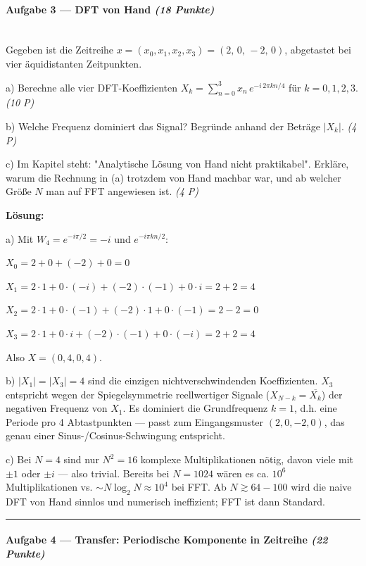 \documentclass[11pt, a4paper]{article}
\begin{document}
\paragraph{Aufgabe 3 — DFT von Hand \textit{(18 Punkte)}}\mbox{}\\[2pt]

Gegeben ist die Zeitreihe $x = (x_0, x_1, x_2, x_3) = (2,\,0,\,-2,\,0)$, abgetastet bei vier äquidistanten Zeitpunkten.


a) Berechne alle vier DFT-Koeffizienten $X_k = \sum_{n=0}^{3} x_n\,e^{-i\,2\pi kn/4}$ für $k=0,1,2,3$. \textit{(10 P)}


b) Welche Frequenz dominiert das Signal? Begründe anhand der Beträge $|X_k|$. \textit{(4 P)}


c) Im Kapitel steht: "Analytische Lösung von Hand nicht praktikabel". Erkläre, warum die Rechnung in (a) trotzdem von Hand machbar war, und ab welcher Größe $N$ man auf FFT angewiesen ist. \textit{(4 P)}


\textbf{Lösung:}


a) Mit $W_4 = e^{-i\pi/2} = -i$ und $e^{-i\pi kn/2}$:


$X_0 = 2 + 0 + (-2) + 0 = 0$


$X_1 = 2\cdot 1 + 0\cdot(-i) + (-2)\cdot(-1) + 0\cdot i = 2 + 2 = 4$


$X_2 = 2\cdot 1 + 0\cdot(-1) + (-2)\cdot 1 + 0\cdot(-1) = 2 - 2 = 0$


$X_3 = 2\cdot 1 + 0\cdot i + (-2)\cdot(-1) + 0\cdot(-i) = 2 + 2 = 4$


Also $X = (0, 4, 0, 4)$.


b) $|X_1| = |X_3| = 4$ sind die einzigen nichtverschwindenden Koeffizienten. $X_3$ entspricht wegen der Spiegelsymmetrie reellwertiger Signale ($X_{N-k} = \overline{X_k}$) der negativen Frequenz von $X_1$. Es dominiert die Grundfrequenz $k=1$, d.h. eine Periode pro 4 Abtastpunkten — passt zum Eingangsmuster $(2, 0, -2, 0)$, das genau einer Sinus-/Cosinus-Schwingung entspricht.


c) Bei $N=4$ sind nur $N^2 = 16$ komplexe Multiplikationen nötig, davon viele mit $\pm 1$ oder $\pm i$ — also trivial. Bereits bei $N = 1024$ wären es ca. $10^6$ Multiplikationen vs. $\sim N\log_2 N \approx 10^4$ bei FFT. Ab $N \gtrsim 64\!-\!100$ wird die naive DFT von Hand sinnlos und numerisch ineffizient; FFT ist dann Standard.



\noindent\textcolor{rulegray}{\rule{\linewidth}{0.4pt}}


\paragraph{Aufgabe 4 — Transfer: Periodische Komponente in Zeitreihe \textit{(22 Punkte)}}\mbox{}\\[2pt]
\end{document}
